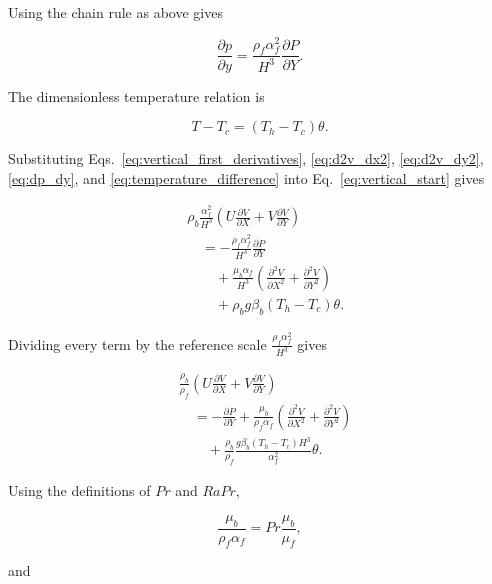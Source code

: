 \documentclass[preprint,3p,number]{elsarticle}
\begin{document}
Using the chain rule as above gives

\begin{equation}
\frac{\partial p}{\partial y}
=
\frac{\rho_f\alpha_f^2}{H^3}
\frac{\partial P}{\partial Y}.
\label{eq:dp_dy}
\end{equation}

The dimensionless temperature relation is

\begin{equation}
T-T_c=(T_h-T_c)\theta.
\label{eq:temperature_difference}
\end{equation}

Substituting Eqs.~\eqref{eq:vertical_first_derivatives},
\eqref{eq:d2v_dx2}, \eqref{eq:d2v_dy2},
\eqref{eq:dp_dy}, and \eqref{eq:temperature_difference}
into Eq.~\eqref{eq:vertical_start} gives

\begin{align}
&\rho_b\frac{\alpha_f^2}{H^3}
\left(
U\frac{\partial V}{\partial X}
+
V\frac{\partial V}{\partial Y}
\right)
\nonumber\\
&\quad =
-\frac{\rho_f\alpha_f^2}{H^3}
\frac{\partial P}{\partial Y}
\nonumber\\
&\qquad+
\frac{\mu_b\alpha_f}{H^3}
\left(
\frac{\partial^2V}{\partial X^2}
+
\frac{\partial^2V}{\partial Y^2}
\right)
\nonumber\\
&\qquad+
\rho_b g\beta_b(T_h-T_c)\theta.
\label{eq:vertical_substituted}
\end{align}

Dividing every term by the reference scale \(\displaystyle \frac{\rho_f\alpha_f^2}{H^3}\) gives

\begin{align}
&\frac{\rho_b}{\rho_f}
\left(
U\frac{\partial V}{\partial X}
+
V\frac{\partial V}{\partial Y}
\right)
\nonumber\\
&\quad =
-\frac{\partial P}{\partial Y}
+
\frac{\mu_b}{\rho_f\alpha_f}
\left(
\frac{\partial^2V}{\partial X^2}
+
\frac{\partial^2V}{\partial Y^2}
\right)
\nonumber\\
&\qquad+
\frac{\rho_b}{\rho_f}
\frac{g\beta_b(T_h-T_c)H^3}{\alpha_f^2}\theta.
\label{eq:vertical_scaled}
\end{align}

Using the definitions of \(Pr\) and \(RaPr\),

\begin{equation}
\frac{\mu_b}{\rho_f\alpha_f}
=
Pr\frac{\mu_b}{\mu_f},
\end{equation}

and
\end{document}
